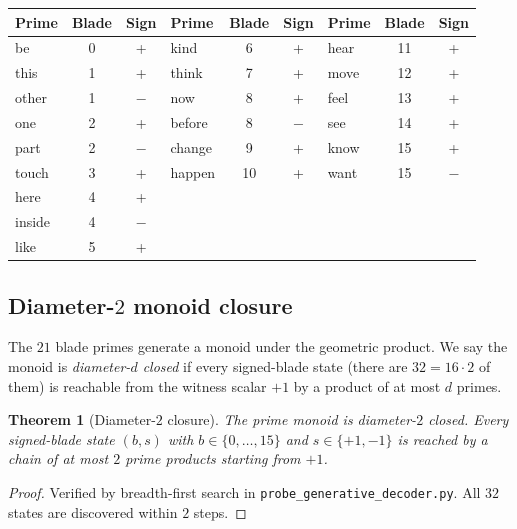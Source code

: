 \documentclass[11pt,a4paper]{article}
\theoremstyle{plain}
\newtheorem{theorem}{Theorem}[section]
\theoremstyle{definition}
\theoremstyle{remark}
\numberwithin{equation}{section}
\begin{document}
\begin{center}
\small
\begin{tabular}{lcclcclcc}
\toprule
Prime & Blade & Sign & Prime & Blade & Sign & Prime & Blade & Sign \\
\midrule
\textsf{be}      &  0 & + & \textsf{kind}   &  6 & + & \textsf{hear}   & 11 & + \\
\textsf{this}    &  1 & + & \textsf{think}  &  7 & + & \textsf{move}   & 12 & + \\
\textsf{other}   &  1 & $-$ & \textsf{now}  &  8 & + & \textsf{feel}   & 13 & + \\
\textsf{one}     &  2 & + & \textsf{before} &  8 & $-$ & \textsf{see}  & 14 & + \\
\textsf{part}    &  2 & $-$ & \textsf{change}&  9 & + & \textsf{know} & 15 & + \\
\textsf{touch}   &  3 & + & \textsf{happen} & 10 & + & \textsf{want}  & 15 & $-$ \\
\textsf{here}    &  4 & + & & & & & & \\
\textsf{inside}  &  4 & $-$ & & & & & & \\
\textsf{like}    &  5 & + & & & & & & \\
\bottomrule
\end{tabular}
\end{center}

\subsection{Diameter-$2$ monoid closure}

The $21$ blade primes generate a monoid under the geometric
product.  We say the monoid is \emph{diameter-$d$ closed} if every
signed-blade state (there are $32 = 16 \cdot 2$ of them) is
reachable from the witness scalar $+1$ by a product of at most
$d$ primes.

\begin{theorem}[Diameter-$2$ closure]\label{thm:diameter}
The prime monoid is diameter-$2$ closed.  Every signed-blade state
$(b, s)$ with $b \in \{0, \ldots, 15\}$ and $s \in \{+1, -1\}$ is
reached by a chain of at most $2$ prime products starting from
$+1$.
\end{theorem}

\begin{proof}
Verified by breadth-first search in
\texttt{probe\_generative\_decoder.py}.  All $32$ states are
discovered within $2$ steps.
\end{proof}
\end{document}
